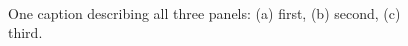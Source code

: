 \begin{figure}[htbp]
  \centering
  \hfill
  \hfill
  \\[0.5em]
  \hfill
  \hfill
  \caption{One caption describing all three panels: (a) first, (b) second,
           (c) third.}
  \label{fig:abc}
\end{figure}

